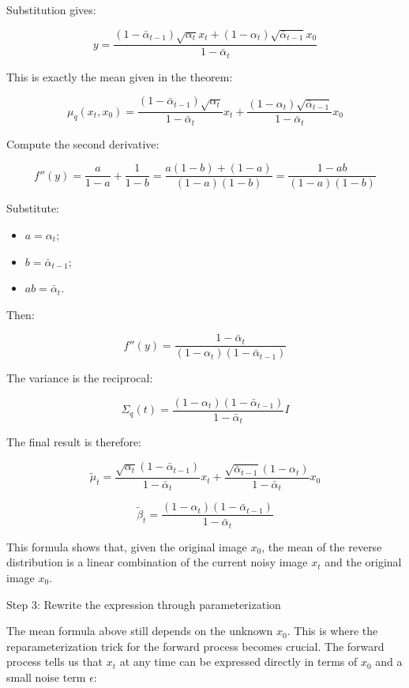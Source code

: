 Substitution gives:

\[
y=\frac{(1-\bar{\alpha}_{t-1})\sqrt{\alpha_t}x_t+(1-\alpha_t)\sqrt{\bar{\alpha}_{t-1}}x_0}{1-\bar{\alpha}_t}
\]

This is exactly the mean given in the theorem:

\[
\mu_q(x_t,x_0)=
\frac{(1-\bar{\alpha}_{t-1})\sqrt{\alpha_t}}{1-\bar{\alpha}_t}x_t
+\frac{(1-\alpha_t)\sqrt{\bar{\alpha}_{t-1}}}{1-\bar{\alpha}_t}x_0
\]

Compute the second derivative:

\[
f''(y)=\frac{a}{1-a}+\frac{1}{1-b}
=\frac{a(1-b)+(1-a)}{(1-a)(1-b)}
=\frac{1-ab}{(1-a)(1-b)}
\]

Substitute:

\begin{itemize}
\tightlist
\item
  \(a=\alpha_t\);
\item
  \(b=\bar{\alpha}_{t-1}\);
\item
  \(ab=\bar{\alpha}_t\).
\end{itemize}

Then:

\[
f''(y)=\frac{1-\bar{\alpha}_t}{(1-\alpha_t)(1-\bar{\alpha}_{t-1})}
\]

The variance is the reciprocal:

\[
\Sigma_q(t)=\frac{(1-\alpha_t)(1-\bar{\alpha}_{t-1})}{1-\bar{\alpha}_t}I
\]

The final result is therefore:

\[
\tilde{\mu}_t=
\frac{\sqrt{\alpha_t}(1-\bar{\alpha}_{t-1})}{1-\bar{\alpha}_t}x_t
+\frac{\sqrt{\bar{\alpha}_{t-1}}(1-\alpha_t)}{1-\bar{\alpha}_t}x_0
\]

\[
\tilde{\beta}_t=\frac{(1-\alpha_t)(1-\bar{\alpha}_{t-1})}{1-\bar{\alpha}_t}
\]

This formula shows that, given the original image \(x_0\), the mean of the reverse distribution is a linear combination of the current noisy image \(x_t\) and the original image \(x_0\).

Step 3: Rewrite the expression through parameterization

The mean formula above still depends on the unknown \(x_0\). This is where the reparameterization trick for the forward process becomes crucial. The forward process tells us that \(x_t\) at any time can be expressed directly in terms of \(x_0\) and a small noise term \(\epsilon\):

